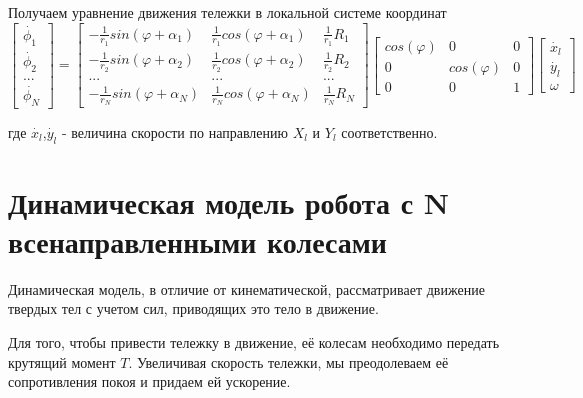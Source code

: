 \documentclass[oneside,final,14pt]{extreport}
\begin{document}
Получаем уравнение движения тележки в локальной системе координат
\begin{equation}
\begin{bmatrix}
\dot{\phi_{1}} \\
\dot{\phi_{2}} \\
...\\
\dot{\phi_{N}}
\end{bmatrix}
=
\begin{bmatrix}
-\frac{1}{r_{1}}sin(\varphi +\alpha_{1}) &
\frac{1}{r_{1}}cos(\varphi +\alpha_{1}) &
\frac{1}{r_{1}}R_{1}
\\
-\frac{1}{r_{2}}sin(\varphi +\alpha_{2}) &
\frac{1}{r_{2}}cos(\varphi +\alpha_{2}) &
\frac{1}{r_{2}}R_{2}
\\
... & ... & ...
\\
-\frac{1}{r_{N}}sin(\varphi +\alpha_{N}) &
\frac{1}{r_{N}}cos(\varphi +\alpha_{N}) &
\frac{1}{r_{N}}R_{N}
\end{bmatrix}
\begin{bmatrix}
cos(\varphi) & 0 & 0 \\
0 & cos(\varphi) & 0 \\
0 & 0 & 1
\end{bmatrix}
\begin{bmatrix}
\dot{x_{l}} \\
\dot{y_{l}} \\
\omega
\end{bmatrix}
\end{equation}

где $\dot{x_{l}}$,$\dot{y_{l}}$ - величина скорости по направлению $X_{l}$ и  $Y_{l}$ соответственно.


\chapter{Динамическая модель робота с N всенаправленными колесами}
Динамическая модель, в отличие от кинематической, рассматривает движение твердых тел с учетом сил, приводящих это тело в движение.
 
Для того, чтобы привести тележку в движение, её колесам необходимо передать крутящий момент $T$. Увеличивая скорость тележки, мы преодолеваем её сопротивления покоя и придаем ей ускорение. 
 
\end{document}
